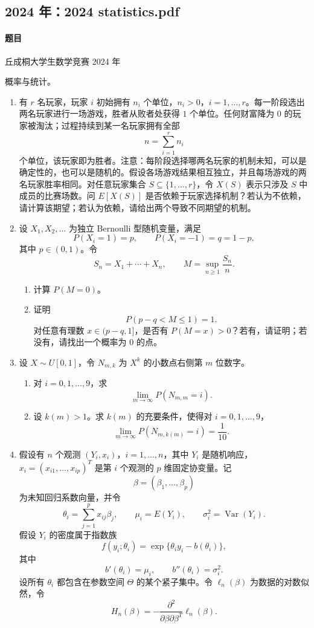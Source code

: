 \documentclass[UTF8,12pt]{ctexart}
\begin{document}
\subsection{2024 年：2024 statistics.pdf}
\paragraph{题目}
丘成桐大学生数学竞赛 2024 年

概率与统计。

\begin{enumerate}[label=\textbf{\arabic*.},leftmargin=2.2em]
\item 有 \(r\) 名玩家，玩家 \(i\) 初始拥有 \(n_i\) 个单位，\(n_i>0\)，\(i=1,\ldots,r\)。每一阶段选出两名玩家进行一场游戏，胜者从败者处获得 \(1\) 个单位。任何财富降为 \(0\) 的玩家被淘汰；过程持续到某一名玩家拥有全部
\[
n=\sum_{i=1}^r n_i
\]
个单位，该玩家即为胜者。注意：每阶段选择哪两名玩家的机制未知，可以是确定性的，也可以是随机的。假设各场游戏结果相互独立，并且每场游戏的两名玩家胜率相同。对任意玩家集合 \(S\subseteq\{1,\ldots,r\}\)，令 \(X(S)\) 表示只涉及 \(S\) 中成员的比赛场数。问 \(E[X(S)]\) 是否依赖于玩家选择机制？若认为不依赖，请计算该期望；若认为依赖，请给出两个导致不同期望的机制。

\item 设 \(X_1,X_2,\ldots\) 为独立 Bernoulli 型随机变量，满足
\[
P(X_i=1)=p,\qquad P(X_i=-1)=q=1-p,
\]
其中 \(p\in(0,1)\)。令
\[
S_n=X_1+\cdots+X_n,\qquad M=\sup_{n\ge1}\frac{S_n}{n}.
\]
\begin{enumerate}[label=\textbf{(\alph*)},leftmargin=2.4em]
\item 计算 \(P(M=0)\)。
\item 证明
\[
P(p-q<M\le1)=1.
\]
对任意有理数 \(x\in(p-q,1]\)，是否有 \(P(M=x)>0\)？若有，请证明；若没有，请找出一个概率为 \(0\) 的点。
\end{enumerate}

\item 设 \(X\sim U[0,1]\)，令 \(N_{m,k}\) 为 \(X^k\) 的小数点右侧第 \(m\) 位数字。
\begin{enumerate}[label=\textbf{(\alph*)},leftmargin=2.4em]
\item 对 \(i=0,1,\ldots,9\)，求
\[
\lim_{m\to\infty}P(N_{m,m}=i).
\]
\item 设 \(k(m)>1\)。求 \(k(m)\) 的充要条件，使得对 \(i=0,1,\ldots,9\)，
\[
\lim_{m\to\infty}P(N_{m,k(m)}=i)=\frac1{10}.
\]
\end{enumerate}

\item 假设有 \(n\) 个观测 \((Y_i,x_i)\)，\(i=1,\ldots,n\)，其中 \(Y_i\) 是随机响应，\(x_i=(x_{i1},\ldots,x_{ip})^T\) 是第 \(i\) 个观测的 \(p\) 维固定协变量。记
\[
\beta=(\beta_1,\ldots,\beta_p)
\]
为未知回归系数向量，并令
\[
\theta_i=\sum_{j=1}^p x_{ij}\beta_j,\qquad
\mu_i=E(Y_i),\qquad \sigma_i^2=\operatorname{Var}(Y_i).
\]
假设 \(Y_i\) 的密度属于指数族
\[
f(y_i;\theta_i)=\exp\{\theta_i y_i-b(\theta_i)\},
\]
其中
\[
b'(\theta_i)=\mu_i,\qquad b''(\theta_i)=\sigma_i^2.
\]
设所有 \(\theta_i\) 都包含在参数空间 \(\Theta\) 的某个紧子集中。令 \(\ell_n(\beta)\) 为数据的对数似然，令
\[
H_n(\beta)=-\frac{\partial^2}{\partial\beta\partial\beta^T}\ell_n(\beta).
\]


\end{enumerate}
\end{document}
